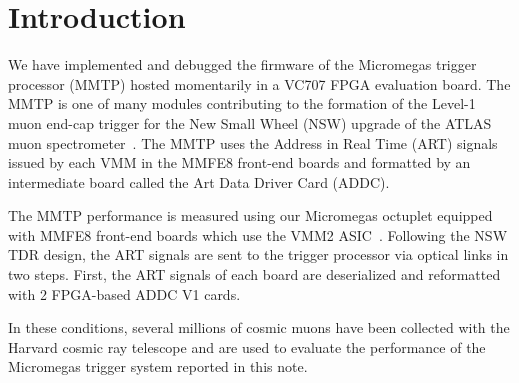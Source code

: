\section{Introduction}
\label{sec:intro}

We have implemented and debugged the firmware of the Micromegas trigger processor (MMTP) hosted momentarily
in a VC707 FPGA evaluation board.
The MMTP is one of many modules contributing to the formation of the Level-1 muon end-cap
 trigger for the New Small Wheel (NSW) upgrade of the ATLAS muon spectrometer~\cite{nswtdr}.
 The MMTP  uses  the  Address in Real Time (ART) signals issued by each VMM in the MMFE8 front-end boards
 and formatted by an intermediate board called the Art Data Driver Card (ADDC). 



The MMTP performance is measured using our Micromegas octuplet equipped with MMFE8 front-end boards which use the 
VMM2 ASIC~\cite{noisy,noiseless}. Following the  NSW TDR design, the ART signals are sent to the trigger processor via optical links
 in two steps. First, the ART signals of each board are deserialized and reformatted with 2 FPGA-based ADDC V1 cards.  

 In these conditions,  several millions of cosmic muons have been collected with the Harvard cosmic ray telescope and are used 
to evaluate the performance of the Micromegas trigger system reported in this note.
